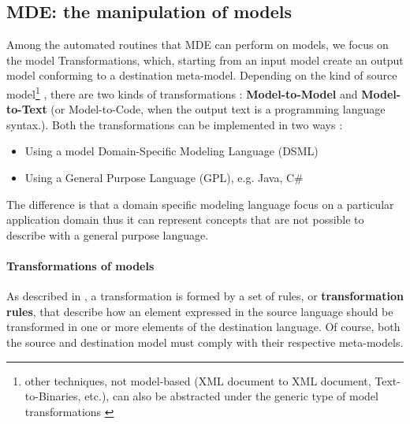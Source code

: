 \subsection{MDE: the manipulation of models}
\label{MDEModelManipulation}
Among the automated routines that MDE can perform on models, we focus on the model Transformations, which, starting from an input model create an output model conforming to a destination meta-model. 
Depending on the kind of source model\footnote{other techniques, not model-based (XML document to XML document, Text-to-Binaries, etc.), can also be abstracted under the generic type of model transformations \cite{M2TandM2M}} , there are two kinds of transformations \cite{Papa11}: \textbf{Model-to-Model} and \textbf{Model-to-Text} (or Model-to-Code, when the output text is a programming language syntax.). Both the transformations can be implemented in two ways \cite{M2TandM2M}:
\begin{itemize}
 \item Using a model Domain-Specific Modeling Language (DSML)
 \item Using a General Purpose Language (GPL), e.g. Java, C\#
\end{itemize}
The difference is that a domain specific modeling language focus on a particular application domain thus it can represent concepts that are not possible to describe with a general purpose language.

\paragraph{Transformations of models}
As described in \cite{Papa11}, a transformation is formed by a set of rules, or \textbf{transformation rules}, that describe how an element expressed in the source language should be transformed in one or more elements of the destination language.
Of course, both the source and destination model must comply with their respective meta-models.


   

% 


